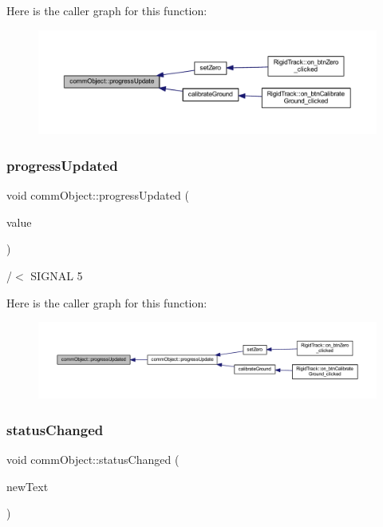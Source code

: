 Here is the caller graph for this function\+:\nopagebreak
\begin{figure}[H]
\begin{center}
\leavevmode
\includegraphics[width=350pt]{classcomm_object_acfc97f4310e2b7d841ecb8cf8be0088e_icgraph}
\end{center}
\end{figure}
\mbox{\label{classcomm_object_a6039d306f25a6b46c78942edf9cee662}} 
\subsubsection{progress\+Updated}
{\footnotesize\ttfamily void comm\+Object\+::progress\+Updated (\begin{DoxyParamCaption}\item[{int}]{value }\end{DoxyParamCaption})\hspace{0.3cm}{\ttfamily [signal]}}



/$<$ S\+I\+G\+N\+AL 5 

Here is the caller graph for this function\+:\nopagebreak
\begin{figure}[H]
\begin{center}
\leavevmode
\includegraphics[width=350pt]{classcomm_object_a6039d306f25a6b46c78942edf9cee662_icgraph}
\end{center}
\end{figure}
\mbox{\label{classcomm_object_adccf5b5946d35d5cf6d76f367f93e335}} 
\subsubsection{status\+Changed}
{\footnotesize\ttfamily void comm\+Object\+::status\+Changed (\begin{DoxyParamCaption}\item[{Q\+String}]{new\+Text }\end{DoxyParamCaption})\hspace{0.3cm}{\ttfamily [signal]}}



